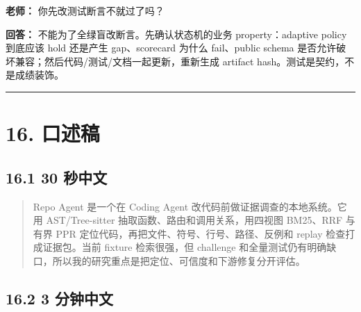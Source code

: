 \documentclass[UTF8,12pt,openany]{ctexbook}
\begin{document}
\textbf{老师：} 你先改测试断言不就过了吗？\par

\textbf{回答：} 不能为了全绿盲改断言。先确认状态机的业务 property：adaptive policy 到底应该 hold 还是产生 gap、scorecard 为什么 fail、public schema 是否允许破坏兼容；然后代码/测试/文档一起更新，重新生成 artifact hash。测试是契约，不是成绩装饰。\par

\hrule

\section{16. 口述稿}

\subsection{16.1 30 秒中文}

\begin{quote}
Repo Agent 是一个在 Coding Agent 改代码前做证据调查的本地系统。它用 AST/Tree-sitter 抽取函数、路由和调用关系，用四视图 BM25、RRF 与有界 PPR 定位代码，再把文件、符号、行号、路径、反例和 replay 检查打成证据包。当前 fixture 检索很强，但 challenge 和全量测试仍有明确缺口，所以我的研究重点是把定位、可信度和下游修复分开评估。
\end{quote}

\subsection{16.2 3 分钟中文}
\end{document}

